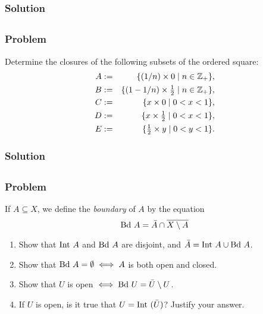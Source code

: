 \subsubsection{Solution}
\todo


\setcounter{subsection}{17} %
\subsection{}

\subsubsection{Problem}
Determine the closures of the following subsets of the ordered square:
\begin{eqnarray*}
    A & := & \{ (1/n) \times 0 \mid n \in \mathbb Z_+ \},\\
    B & := & \{ (1-1/n) \times \tfrac12 \mid n \in \mathbb Z_+ \},\\
    C & := & \{ x \times 0 \mid 0 < x < 1 \},\\
    D & := & \{ x \times \tfrac12 \mid 0 < x < 1 \},\\
    E & := & \{ \tfrac12 \times y \mid 0 < y < 1 \}.
\end{eqnarray*}
\subsubsection{Solution}
\todo


\setcounter{subsection}{18} %
\subsection{}
\subsubsection{Problem}
If $A \subseteq X$, we define the \emph{boundary} of $A$ by the equation
\[\mathrm{Bd\ } A = \bar A \cap \overline{X \setminus A}\]
\begin{enumerate}
\item Show that $\mathrm{Int\ } A$ and $\mathrm{Bd\ } A$ are disjoint, and $\bar A = \mathrm{Int\ } A \cup \mathrm{Bd\ } A$.
\item Show that $\mathrm{Bd\ } A = \emptyset \iff A$ is both open and closed.
\item Show that $U$ is open $\iff \mathrm{Bd\ } U = \bar U \setminus U$.
\item If $U$ is open, is it true that $U = \mathrm{Int\ }(\bar U)$? Justify your answer.
\end{enumerate}

